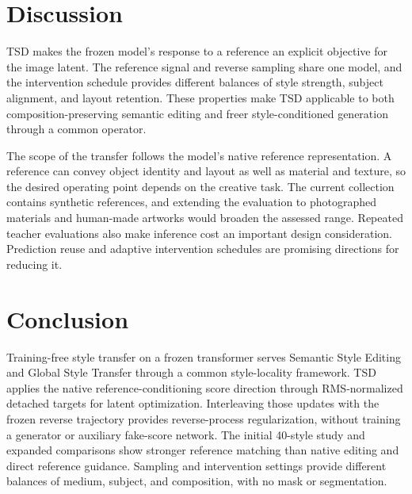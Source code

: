 \section{Discussion}
\label{sec:limitations}
TSD makes the frozen model's response to a reference an explicit objective
for the image latent. The reference signal and reverse sampling share one
model, and the intervention schedule provides different balances of style
strength, subject alignment, and layout retention. These properties make
TSD applicable to both composition-preserving semantic editing and freer
style-conditioned generation through a common operator.

The scope of the transfer follows the model's native reference
representation. A reference can convey object identity and layout as well
as material and texture, so the desired operating point depends on the
creative task. The current collection contains synthetic references, and
extending the evaluation to photographed materials and human-made artworks
would broaden the assessed range. Repeated teacher evaluations also make
inference cost an important design consideration. Prediction reuse and
adaptive intervention schedules are promising directions for reducing it.

\section{Conclusion}
\label{sec:conclusion}
Training-free style transfer on a frozen transformer serves Semantic Style
Editing and Global Style Transfer through a common style-locality framework.
TSD applies the native reference-conditioning score direction through
RMS-normalized detached targets for latent optimization. Interleaving those
updates with the frozen reverse trajectory provides reverse-process
regularization, without training a generator or auxiliary fake-score
network. The initial 40-style study and expanded comparisons show stronger
reference matching than native editing and direct reference guidance.
Sampling and intervention settings provide different balances of medium,
subject, and composition, with no mask or segmentation.
